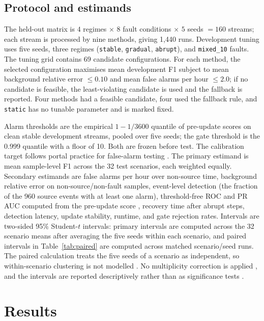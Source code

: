 \documentclass[11pt]{article}
\begin{document}
\subsection{Protocol and estimands}

The held-out matrix is $4$ regimes $\times$ $8$ fault conditions $\times$ $5$ seeds $=160$ streams; each stream is processed by nine methods, giving 1{,}440 runs. Development tuning uses five seeds, three regimes (\texttt{stable}, \texttt{gradual}, \texttt{abrupt}), and \texttt{mixed\_10} faults. The tuning grid contains 69 candidate configurations. For each method, the selected configuration maximises mean development F1 subject to mean background relative error $\le 0.10$ and mean false alarms per hour $\le 2.0$; if no candidate is feasible, the least-violating candidate is used and the fallback is reported. Four methods had a feasible candidate, four used the fallback rule, and \texttt{static} has no tunable parameter and is marked fixed.

Alarm thresholds are the empirical $1-1/3600$ quantile of pre-update scores on clean stable development streams, pooled over five seeds; the gate threshold is the 0.999 quantile with a floor of 10. Both are frozen before test. The calibration target follows portal practice for false-alarm testing \citep{burr2007alarm,leber2020false}. The primary estimand is mean sample-level F1 across the 32 test scenarios, each weighted equally. Secondary estimands are false alarms per hour over non-source time, background relative error on non-source/non-fault samples, event-level detection (the fraction of the 960 source events with at least one alarm), threshold-free ROC and PR AUC computed from the pre-update score \citep{fawcett2006roc}, recovery time after abrupt steps, detection latency, update stability, runtime, and gate rejection rates. Intervals are two-sided 95\% Student-$t$ intervals: primary intervals are computed across the 32 scenario means after averaging the five seeds within each scenario, and paired intervals in Table~\ref{tab:paired} are computed across matched scenario/seed runs. The paired calculation treats the five seeds of a scenario as independent, so within-scenario clustering is not modelled \citep{cameron2015cluster}. No multiplicity correction is applied \citep{benjamini1995controlling}, and the intervals are reported descriptively rather than as significance tests \citep{greenland2016statistical}.

\section{Results}
\end{document}
